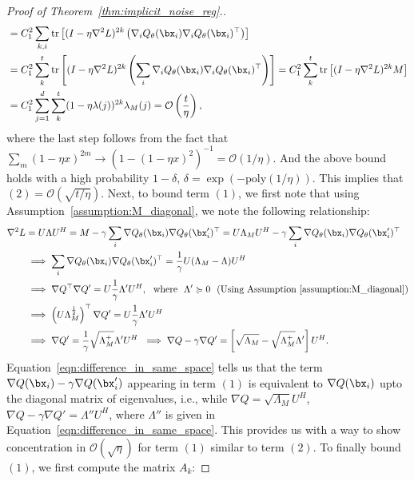 \begin{proof}[Proof of Theorem~\ref{thm:implicit_noise_reg}.]
\begin{align*}
    &= C_1^2 \sum_{k, i} \text{tr} \left[ (I - \eta \nabla^2 L)^{2k} \left(\nabla_i Q_\theta(\bx_i) \nabla_i Q_\theta(\bx_i)^\top \right)  \right]\\
    &= C_1^2 \sum_k^t \text{tr} \left[ (I - \eta \nabla^2 L)^{2k} \left(\sum_i \nabla_i Q_\theta(\bx_i) \nabla_i Q_\theta(\bx_i)^\top \right)  \right] = C_1^2 \sum_k^t \text{tr} \left[ (I - \eta \nabla^2 L)^{2k} M \right]\\
    &= C_1^2 \sum_{j=1}^d \sum_k^t (1 - \eta \lambda(j))^{2k} \lambda_M(j)  = \mathcal{O}\left(\frac{t}{\eta}\right),
\end{align*}
where the last step follows from the fact that $\sum_{m} (1 - \eta x)^{2m} \rightarrow (1 - (1 - \eta x)^2)^{-1} = \mathcal{O}(1/\eta)$. And the above bound holds with a high probability $1 - \delta$, $\delta = \exp(-\text{poly}(1/\eta))$. This implies that $(2) = \mathcal{O} (\sqrt{t/\eta})$. Next, to bound term $(1)$, we first note that using Assumption~\ref{assumption:M_diagonal}, we note the following relationship:
\begin{align}
    \label{eqn:bounding_1}
    \nabla^2 L &= U \Lambda U^H = M - \gamma \sum_i \nabla Q_\theta(\bx_i) \nabla Q_\theta(\bx'_i)^\top = U \Lambda_M U^H - \gamma \sum_i \nabla Q_\theta(\bx_i) \nabla Q_\theta(\bx'_i)^\top\\
    &  \implies \sum_i \nabla Q_\theta(\bx_i) \nabla Q_\theta(\bx'_i)^\top = \frac{1}{\gamma} U (\Lambda_M - \Lambda) U^H\\
    & \implies \nabla Q^\top \nabla Q' = U \frac{1}{\gamma}\Lambda' U^H, \text{~~where~~} \Lambda' \succcurlyeq 0 ~~ \text{(Using Assumption~\ref{assumption:M_diagonal})}\\
    & \implies \left( U \Lambda_M^{\frac{1}{2}} \right)^\top \nabla Q' = U \frac{1}{\gamma} \Lambda' U^H \\
    \label{eqn:difference_in_same_space}
    & \implies \nabla Q' = \frac{1}{\gamma} \sqrt{\Lambda_M^{+}} \Lambda' U^H ~\implies \nabla Q - \gamma \nabla Q' = \left[ \sqrt{\Lambda_M} - \sqrt{\Lambda_M^{+}} \Lambda'  \right] U^H. 
\end{align}
Equation~\ref{eqn:difference_in_same_space} tells us that the term $\nabla Q(\bx_i) - \gamma \nabla Q(\bx'_i)$ appearing in term $(1)$ is equivalent to $\nabla Q(\bx_i)$ upto the diagonal matrix of eigenvalues, i.e., while $\nabla Q = \sqrt{\Lambda_M} U^H$, $\nabla Q - \gamma \nabla Q' = \Lambda'' U^H$, where $\Lambda''$ is given in Equation~\ref{eqn:difference_in_same_space}. This provides us with a way to show concentration in $\mathcal{O}(\sqrt{\eta})$ for term $(1)$ similar to term $(2)$. To finally bound $(1)$, we first compute the matrix $A_k$:

\end{proof}
